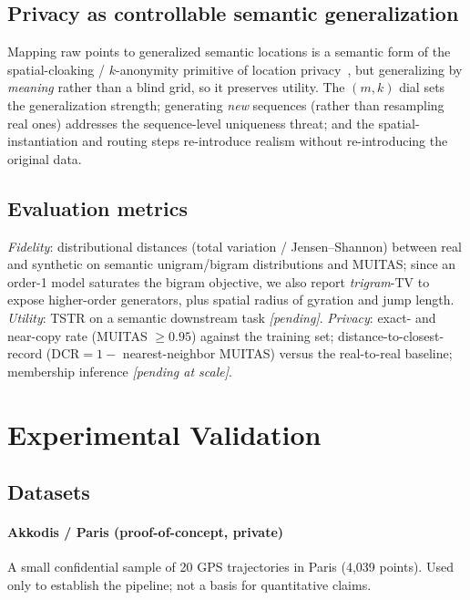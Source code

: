 \documentclass[sigconf,nonacm]{acmart}
\begin{document}
\subsection{Privacy as controllable semantic generalization}
Mapping raw points to generalized semantic locations is a semantic form of the spatial-cloaking /
$k$-anonymity primitive of location privacy~\cite{gruteser2003}, but generalizing by \emph{meaning}
rather than a blind grid, so it preserves utility. The $(m,k)$ dial sets the generalization strength;
generating \emph{new} sequences (rather than resampling real ones) addresses the sequence-level
uniqueness threat; and the spatial-instantiation and routing steps re-introduce realism without
re-introducing the original data.

\subsection{Evaluation metrics}
\emph{Fidelity}: distributional distances (total variation / Jensen--Shannon) between real and
synthetic on semantic unigram/bigram distributions and MUITAS; since an order-1 model saturates the
bigram objective, we also report \emph{trigram}-TV to expose higher-order generators, plus spatial
radius of gyration and jump length. \emph{Utility}: TSTR on a semantic downstream task \textit{[pending]}. \emph{Privacy}:
exact- and near-copy rate (MUITAS $\geq 0.95$) against the training set; distance-to-closest-record
($\text{DCR}=1-$ nearest-neighbor MUITAS) versus the real-to-real baseline; membership inference
\textit{[pending at scale]}.

\section{Experimental Validation}

\subsection{Datasets}
\paragraph{Akkodis / Paris (proof-of-concept, private)}
A small confidential sample of 20 GPS trajectories in Paris (4{,}039 points). Used only to establish
the pipeline; not a basis for quantitative claims.
\end{document}
